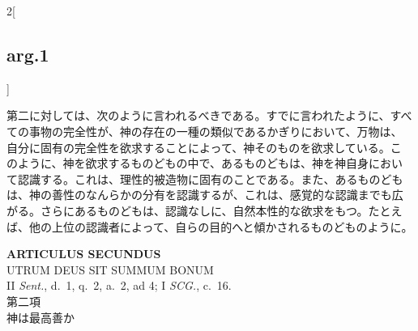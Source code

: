 \documentclass[paper=a4paper,fontsize=10pt,jafontsize=9pt,titlepage]{jlreq}
\begin{document}
\begin{paracol}{2}[\subsection{arg.1}]
\switchcolumn

第二に対しては、次のように言われるべきである。すでに言われたように、すべ
 ての事物の完全性が、神の存在の一種の類似であるかぎりにおいて、万物は、
 自分に固有の完全性を欲求することによって、神そのものを欲求している。こ
 のように、神を欲求するものどもの中で、あるものどもは、神を神自身におい
 て認識する。これは、理性的被造物に固有のことである。また、あるものども
 は、神の善性のなんらかの分有を認識するが、これは、感覚的な認識までも広
 がる。さらにあるものどもは、認識なしに、自然本性的な欲求をもつ。たとえ
 ば、他の上位の認識者によって、自らの目的へと傾かされるものどものように。

\end{paracol}

\newpage
{}

\begin{center}
 {\Large {\bfseries ARTICULUS SECUNDUS}}\\
 {\large UTRUM DEUS SIT SUMMUM BONUM}\\
 {\footnotesize II {\itshape Sent.}, d.~1, q.~2, a.~2, ad 4; I {\itshape
 SCG.}, c.~16.}\\
 {\Large 第二項\\神は最高善か}
\end{center}

{}
\setcounter{section}{2}
\setcounter{subsection}{0}
\end{document}
